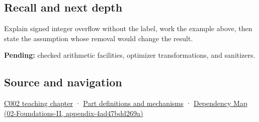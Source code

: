 \subsection{Recall and next depth}\label{recall-and-next-depth}

Explain signed integer overflow without the label, work the example above, then state the assumption whose removal would change the result.

\textbf{Pending:} checked arithmetic facilities, optimizer transformations, and sanitizers.

\subsection{Source and navigation}\label{source-and-navigation}

\href{Continuous\%20Notes/Computing\%20Foundations\%20-\%20From\%20Bits\%20to\%20C++\%20and\%20Systems\%20APIs\#Arithmetic\%20becomes\%20a\%20policy}{C002 teaching chapter} · \hyperref[appendix-fd090d982a15]{Part definitions and mechanisms} · \href{}{Dependency Map (02-Foundations-II, appendix-4ad47bdd269a)}
